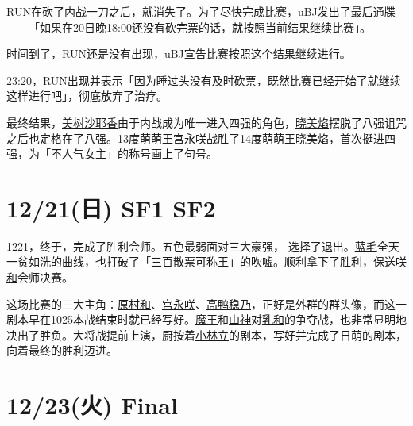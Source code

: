 \uline{RUN}在砍了内战一刀之后，就消失了。为了尽快完成比赛，\uline{uBJ}发出了最后通牒——「如果在20日晚18:00还没有砍完票的话，就按照当前结果继续比赛」。

时间到了，\uline{RUN}还是没有出现，\uline{uBJ}宣告比赛按照这个结果继续进行。

23:20，\uline{RUN}出现并表示「因为睡过头没有及时砍票，既然比赛已经开始了就继续这样进行吧」，彻底放弃了治疗。

最终结果，\uline{美树沙耶香}由于内战成为唯一进入四强的角色，\uline{晓美焰}摆脱了八强诅咒之后也定格在了八强。13度萌萌王\uline{宫永咲}战胜了14度萌萌王\uline{晓美焰}，首次挺进四强，为「不人气女主」的称号画上了句号。

\section{12/21(日) SF1 SF2}



1221，终于，完成了胜利会师。五色最弱面对三大豪强， 选择了退出。\uline{蓝毛}全天一贫如洗的曲线，也打破了「三百散票可称王」的吹嘘。顺利拿下了胜利，保送\uline{咲}\uline{和}会师决赛。

这场比赛的三大主角：\uline{原村和}、\uline{宫永咲}、\uline{高鸭稳乃}，正好是外群的群头像，而这一剧本早在1025本战结束时就已经写好。\uline{魔王}和\uline{山神}对\uline{乳和}的争夺战，也非常显明地决出了胜负。大将战提前上演，厨按着\uline{小林立}的剧本，写好并完成了日萌的剧本，向着最终的胜利迈进。

\section{12/23(火) Final}



